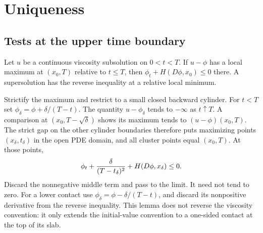 \Needspace{80mm}
\section{Uniqueness}
\label{sec:10-2}
\subsection{Tests at the upper time boundary}
\Needspace{50mm}
\begin{lemma}
Let $u$ be a continuous viscosity subsolution on $0<t<T$.
If $u-\phi$ has a local maximum at $(x_0,T)$ relative to $t\leq T$,
then $\phi_t+H(D\phi,x_0)\leq0$ there. A supersolution has the
reverse inequality at a relative local minimum.
\end{lemma}
\begin{expandedproof}
Strictify the maximum and restrict to a small closed backward cylinder.
For $t<T$ set $\phi_\delta=\phi+\delta/(T-t)$.
The quantity $u-\phi_\delta$ tends to $-\infty$ as $t\uparrow T$.
A comparison at $(x_0,T-\sqrt\delta)$ shows its maximum tends to
$(u-\phi)(x_0,T)$. The strict gap on the other cylinder boundaries
therefore puts maximizing points $(x_\delta,t_\delta)$ in the open
PDE domain, and all cluster points equal $(x_0,T)$. At those points,
\[
 \phi_t+{\delta\over(T-t_\delta)^2}+H(D\phi,x_\delta)\leq0.
\]
Discard the nonnegative middle term and pass to the limit. It need not
tend to zero. For a lower contact use
$\phi_\delta=\phi-\delta/(T-t)$, and discard its nonpositive derivative
from the reverse inequality. This lemma does not reverse the viscosity
convention: it only extends the initial-value convention to a one-sided
contact at the top of its slab.
\end{expandedproof}
\Needspace{42mm}

\Needspace{70mm}
